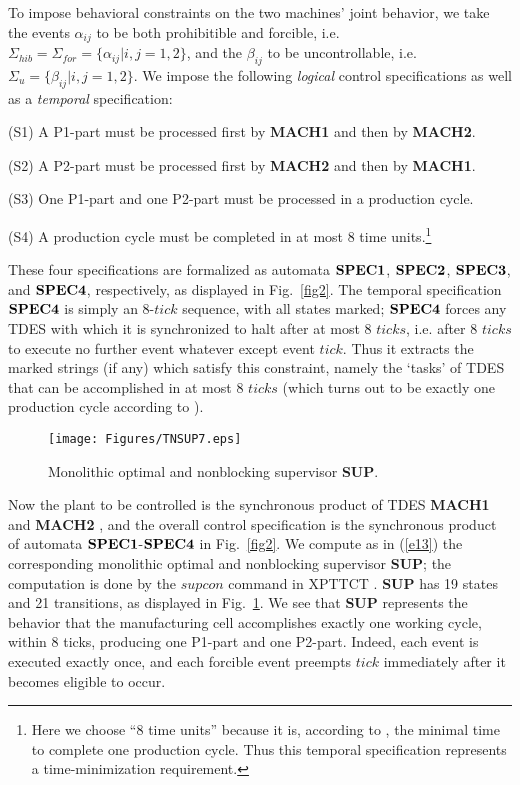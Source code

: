 \documentclass[twocolumn]{autart}
\begin{document}
To impose behavioral constraints on the two machines' joint
behavior, we take the events $\alpha_{ij}$ to be both prohibitible and forcible,
i.e. $\Sigma_{hib}=\Sigma_{for} = \{\alpha_{ij}|i,j =
1,2\}$, and the $\beta_{ij}$ to be uncontrollable, i.e. $\Sigma_u
= \{\beta_{ij}|i,j = 1,2\}$. We impose the following {\it logical}
control specifications as well as a {\it temporal} specification:

(S1) A P1-part must be processed first by {\bf MACH1} and then by
{\bf MACH2}.

(S2) A P2-part must be processed first by {\bf MACH2} and then by
{\bf MACH1}.

(S3) One P1-part and one P2-part must be processed in a production
cycle.

(S4) A production cycle must be completed in at most 8 time
units.\footnote{Here we choose ``8 time units'' because it is,
according to \cite{BrandinWonham:94, Wonham:2011a}, the minimal time
to complete one production cycle. Thus this temporal specification
represents a time-minimization requirement.}

\noindent These four specifications are formalized as automata $\bf
SPEC1$, $\bf SPEC2$, $\bf SPEC3$, and $\bf SPEC4$, respectively, as
displayed in Fig.~\ref{fig2}.  The temporal specification $\bf
SPEC4$ is simply an $8$-$tick$ sequence, with all states marked;
$\bf SPEC4$ forces any TDES with which it is synchronized to halt
after at most 8 $ticks$, i.e. after 8 $ticks$ to execute no further
event whatever except event $tick$. Thus it extracts the marked
strings (if any) which satisfy this constraint, namely the `tasks'
of TDES that can be accomplished in at most 8 $ticks$ (which turns
out to be exactly one production cycle according to
\cite{BrandinWonham:94, Wonham:2011a}).

\begin{figure}[!t]
\centering
    \texttt{[image: Figures/TNSUP7.eps]}
\caption{Monolithic optimal and nonblocking supervisor {\bf SUP}.}
\label{fig:sup}
\end{figure}

Now the plant to be controlled is the synchronous product of TDES
{\bf MACH1} and {\bf MACH2} \cite[p.425]{Wonham:2011a}, and the overall
control specification is the synchronous product of automata $\bf
SPEC1$-$\bf SPEC4$ in Fig.~\ref{fig2}.  We compute as in (\ref{e13})
the corresponding monolithic optimal and nonblocking supervisor {\bf
SUP}; the computation is done by the $supcon$ command in XPTTCT
\cite{Wonham:2008}. {\bf SUP} has 19 states and 21 transitions, as
displayed in Fig.~\ref{fig:sup}. We see that {\bf SUP} represents
the behavior that the manufacturing cell accomplishes exactly one
working cycle, within $8$ ticks, producing one P1-part and one
P2-part. Indeed, each event is executed exactly once, and each
forcible event preempts $tick$ immediately after it becomes eligible
to occur.
\end{document}
